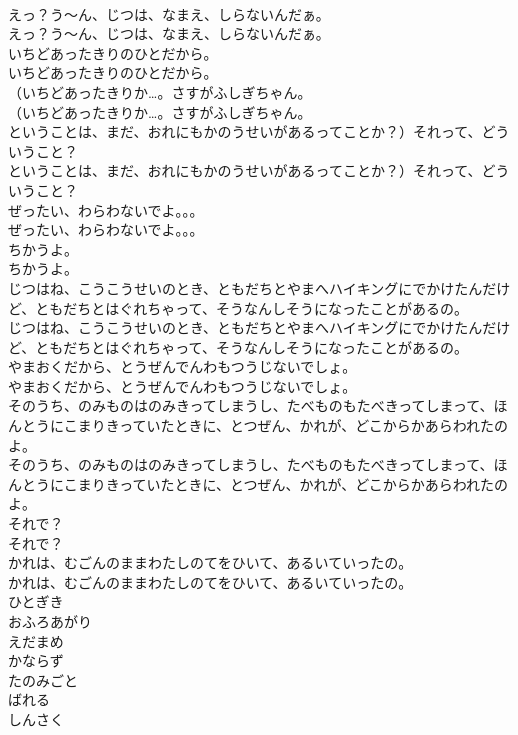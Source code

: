 \documentclass[8pt]{extreport}
\begin{document}
\begin{CJK}{UTF8}{min}
\\	えっ？う～ん、じつは、なまえ、しらないんだぁ。	
\\	えっ？う～ん、じつは、なまえ、しらないんだぁ。 
\\	いちどあったきりのひとだから。	
\\	いちどあったきりのひとだから。 
\\	（いちどあったきりか…。さすがふしぎちゃん。	
\\	（いちどあったきりか…。さすがふしぎちゃん。 
\\	ということは、まだ、おれにもかのうせいがあるってことか？）それって、どういうこと？	
\\	ということは、まだ、おれにもかのうせいがあるってことか？）それって、どういうこと？ 
\\	ぜったい、わらわないでよ。。。	
\\	ぜったい、わらわないでよ。。。 
\\	ちかうよ。	
\\	ちかうよ。 
\\	じつはね、こうこうせいのとき、ともだちとやまへハイキングにでかけたんだけど、ともだちとはぐれちゃって、そうなんしそうになったことがあるの。	
\\	じつはね、こうこうせいのとき、ともだちとやまへハイキングにでかけたんだけど、ともだちとはぐれちゃって、そうなんしそうになったことがあるの。 
\\	やまおくだから、とうぜんでんわもつうじないでしょ。	
\\	やまおくだから、とうぜんでんわもつうじないでしょ。 
\\	そのうち、のみものはのみきってしまうし、たべものもたべきってしまって、ほんとうにこまりきっていたときに、とつぜん、かれが、どこからかあらわれたのよ。	
\\	そのうち、のみものはのみきってしまうし、たべものもたべきってしまって、ほんとうにこまりきっていたときに、とつぜん、かれが、どこからかあらわれたのよ。 
\\	それで？	
\\	それで？ 
\\	かれは、むごんのままわたしのてをひいて、あるいていったの。	
\\	かれは、むごんのままわたしのてをひいて、あるいていったの。 
\\	ひとぎき
\\	おふろあがり
\\	えだまめ
\\	かならず
\\	たのみごと
\\	ばれる
\\	しんさく

\end{CJK}
\end{document}
